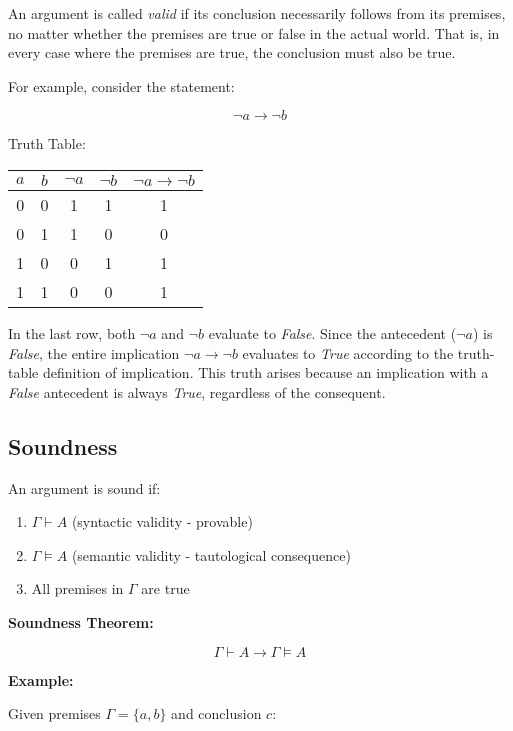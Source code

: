 \documentclass[12pt,a4paper,openany]{article}
\begin{document}
An argument is called \emph{valid} if its conclusion necessarily follows
from its premises, no matter whether the premises are true or false in
the actual world. That is, in every case where the premises are true,
the conclusion must also be true.

For example, consider the statement:

\[
\neg a \to \neg b
\]

Truth Table:

\begin{center}
\begin{tabular}{|c|c|c|c|c|}
\hline
\(a\) & \(b\) & \(\neg a\) & \(\neg b\) & \(\neg a \to \neg b\) \\
\hline
0 & 0 & 1 & 1 & 1 \\
0 & 1 & 1 & 0 & 0 \\
1 & 0 & 0 & 1 & 1 \\
1 & 1 & 0 & 0 & 1 \\
\hline
\end{tabular}
\end{center}

In the last row, both \(\neg a\) and \(\neg b\) evaluate to
\emph{False}. Since the antecedent (\(\neg a\)) is \emph{False}, the
entire implication \(\neg a \to \neg b\) evaluates to \emph{True}
according to the truth-table definition of implication. This truth
arises because an implication with a \emph{False} antecedent is always
\emph{True}, regardless of the consequent.

\subsection{Soundness}\label{soundness}

An argument is sound if: 

\begin{enumerate}
\item \(\Gamma \vdash A\) (syntactic validity - provable)
\item \(\Gamma \models A\) (semantic validity - tautological consequence)
\item All premises in \(\Gamma\) are true
\end{enumerate}

\textbf{Soundness Theorem:}

\[\Gamma \vdash A \to \Gamma \models A \]

\textbf{Example:} 

Given premises \(\Gamma = \{a, b\}\) and conclusion \(c\):
\end{document}
